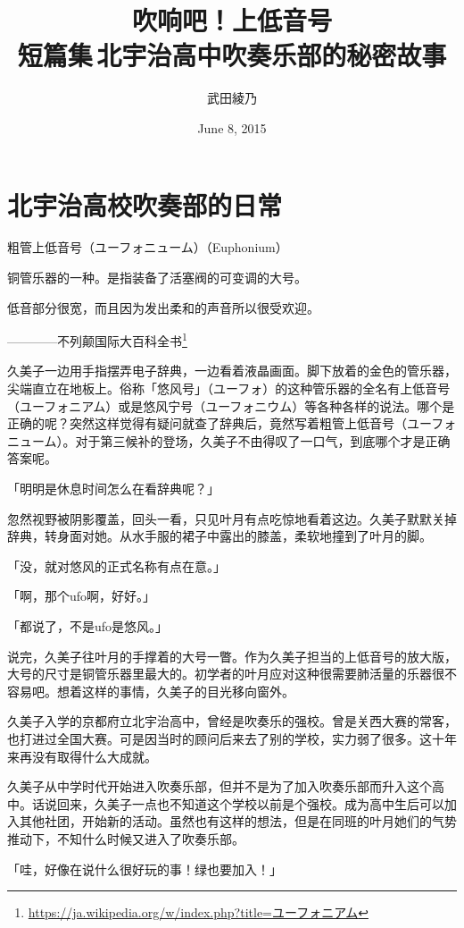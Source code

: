\documentclass[UTF8]{ctexart}
\title{吹响吧！上低音号\\ \Large{短篇集\,北宇治高中吹奏乐部的秘密故事}}
\date{June 8, 2015}
\author{武田綾乃}
\begin{document}
    \maketitle
    \tableofcontents
    \section{北宇治高校吹奏部的日常}
    粗管上低音号（ユーフォニューム）（Euphonium）

    铜管乐器的一种。是指装备了活塞阀的可变调的大号。

    低音部分很宽，而且因为发出柔和的声音所以很受欢迎。

    ————不列颠国际大百科全书\footnote{\href{https://ja.wikipedia.org/w/index.php?title=ユーフォニアム}{https://ja.wikipedia.org/w/index.php?title=ユーフォニアム}}

    久美子一边用手指摆弄电子辞典，一边看着液晶画面。脚下放着的金色的管乐器，尖端直立在地板上。俗称「悠风号」（ユーフォ）的这种管乐器的全名有上低音号（ユーフォニアム）或是悠风宁号（ユーフォニウム）等各种各样的说法。哪个是正确的呢？突然这样觉得有疑问就查了辞典后，竟然写着粗管上低音号（ユーフォニューム）。对于第三候补的登场，久美子不由得叹了一口气，到底哪个才是正确答案呢。

    「明明是休息时间怎么在看辞典呢？」

    忽然视野被阴影覆盖，回头一看，只见叶月有点吃惊地看着这边。久美子默默关掉辞典，转身面对她。从水手服的裙子中露出的膝盖，柔软地撞到了叶月的脚。

    「没，就对悠风的正式名称有点在意。」

    「啊，那个ufo啊，好好。」

    「都说了，不是ufo是悠风。」

    说完，久美子往叶月的手撑着的大号一瞥。作为久美子担当的上低音号的放大版，大号的尺寸是铜管乐器里最大的。初学者的叶月应对这种很需要肺活量的乐器很不容易吧。想着这样的事情，久美子的目光移向窗外。

    久美子入学的京都府立北宇治高中，曾经是吹奏乐的强校。曾是关西大赛的常客，也打进过全国大赛。可是因当时的顾问后来去了别的学校，实力弱了很多。这十年来再没有取得什么大成就。

    久美子从中学时代开始进入吹奏乐部，但并不是为了加入吹奏乐部而升入这个高中。话说回来，久美子一点也不知道这个学校以前是个强校。成为高中生后可以加入其他社团，开始新的活动。虽然也有这样的想法，但是在同班的叶月她们的气势推动下，不知什么时候又进入了吹奏乐部。

    「哇，好像在说什么很好玩的事！绿也要加入！」
\end{document}
